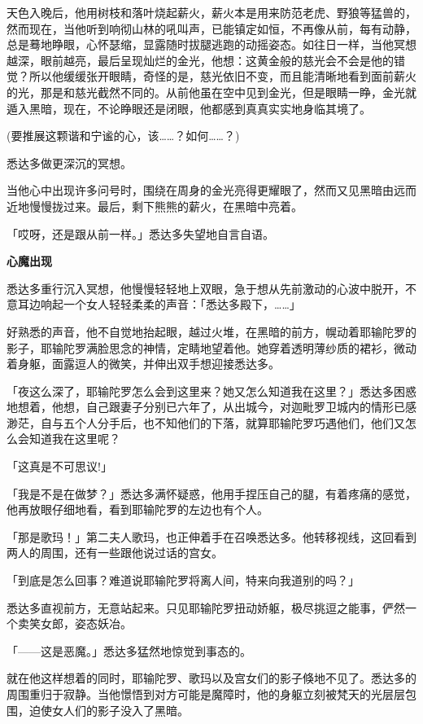 \documentclass[twoside,openany]{book}
\newcommand{\mt}[1]{\textbullet \textbf{#1}}
\begin{document}
天色入晚后，他用树枝和落叶烧起薪火，薪火本是用来防范老虎、野狼等猛兽的，然而现在，当他听到响彻山林的吼叫声，已能镇定如恒，不再像从前，每有动静，总是蓦地睁眼，心怀瑟缩，显露随时拔腿逃跑的动摇姿态。如往日一样，当他冥想越深，眼前越亮，最后呈现灿烂的金光，他想：这黄金般的慈光会不会是他的错觉？所以他缓缓张开眼睛，奇怪的是，慈光依旧不变，而且能清晰地看到面前薪火的光，那是和慈光截然不同的。从前他虽在空中见到金光，但是眼睛一睁，金光就遁入黑暗，现在，不论睁眼还是闭眼，他都感到真真实实地身临其境了。

(要推展这颗谐和宁谧的心，该……？如何……？)

悉达多做更深沉的冥想。

当他心中出现许多问号时，围绕在周身的金光亮得更耀眼了，然而又见黑暗由远而近地慢慢拢过来。最后，剩下熊熊的薪火，在黑暗中亮着。

「哎呀，还是跟从前一样。」悉达多失望地自言自语。

\mt{心魔出现}

悉达多重行沉入冥想，他慢慢轻轻地上双眼，急于想从先前激动的心波中脱开，不意耳边响起一个女人轻轻柔柔的声音：「悉达多殿下，……」

好熟悉的声音，他不自觉地抬起眼，越过火堆，在黑暗的前方，幌动着耶输陀罗的影子，耶输陀罗满脸思念的神情，定睛地望着他。她穿着透明薄纱质的裙衫，微动着身躯，面露逗人的微笑，并伸出双手想迎接悉达多。

「夜这么深了，耶输陀罗怎么会到这里来？她又怎么知道我在这里？」悉达多困惑地想着，他想，自己跟妻子分别已六年了，从出城今，对迦毗罗卫城内的情形已感渺茫，自与五个人分手后，也不知他们的下落，就算耶输陀罗巧遇他们，他们又怎么会知道我在这里呢？

「这真是不可思议!」

「我是不是在做梦？」悉达多满怀疑惑，他用手捏压自己的腿，有着疼痛的感觉，他再放眼仔细地看，看到耶输陀罗的左边也有个人。

「那是歌玛！」第二夫人歌玛，也正伸着手在召唤悉达多。他转移视线，这回看到两人的周围，还有一些跟他说过话的宫女。

「到底是怎么回事？难道说耶输陀罗将离人间，特来向我道别的吗？」

悉达多直视前方，无意站起来。只见耶输陀罗扭动娇躯，极尽挑逗之能事，俨然一个卖笑女郎，姿态妖冶。

「——这是恶魔。」悉达多猛然地惊觉到事态的。

就在他这样想着的同时，耶输陀罗、歌玛以及宫女们的影子倏地不见了。悉达多的周围重归于寂静。当他憬悟到对方可能是魔障时，他的身躯立刻被梵天的光层层包围，迫使女人们的影子没入了黑暗。
\end{document}
